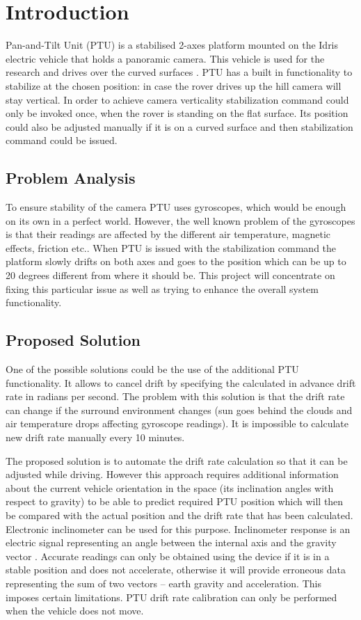 \chapter{Introduction}
Pan-and-Tilt Unit (PTU) is a stabilised 2-axes platform mounted on the Idris electric vehicle that holds a panoramic camera. This vehicle is used for the research and drives over the curved surfaces \cite{ProjectIdris}. PTU has a built in functionality to stabilize at the chosen position: in case the rover drives up the hill camera will stay vertical. In order to achieve camera verticality stabilization command could only be invoked once, when the rover is standing on the flat surface. Its position could also be adjusted manually if it is on a curved surface and then stabilization command could be issued. 

\section{Problem Analysis}
To ensure stability of the camera PTU uses gyroscopes, which would be enough on its own in a perfect world. However, the well known problem of the gyroscopes is that their readings are affected by the different air temperature, magnetic effects, friction etc.\cite{HandbookOfModernSensors}. When PTU is issued with the stabilization command the platform slowly drifts on both axes and goes to the position which can be up to 20 degrees different from where it should be. This project will concentrate on fixing this particular issue as well as trying to enhance the overall system functionality.

\section{Proposed Solution}
One of the possible solutions could be the use of the additional PTU functionality. It allows to cancel drift by specifying the calculated in advance drift rate in radians per second. The problem with this solution is that the drift rate can change if the surround environment changes (sun goes behind the clouds and air temperature drops affecting gyroscope readings). It is impossible to calculate new drift rate manually every 10 minutes.

The proposed solution is to automate the drift rate calculation so that it can be adjusted while driving. However this approach requires additional information about the current vehicle orientation in the space (its inclination angles with respect to gravity) to be able to predict required PTU position which will then be compared with the actual position and the drift rate that has been calculated. Electronic inclinometer can be used for this purpose. Inclinometer response is an electric signal representing an angle between the internal axis and the gravity vector \cite{HandbookOfModernSensors}. Accurate readings can only be obtained using the device if it is in a stable position and does not accelerate, otherwise it will provide erroneous data representing the sum of two vectors – earth gravity and acceleration. This imposes certain limitations. PTU drift rate calibration can only be performed when the vehicle does not move.

